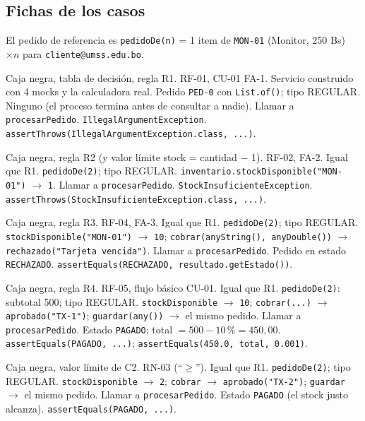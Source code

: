 \documentclass[11pt,a4paper,oneside]{report}
\newcommand{\code}[1]{\texttt{#1}}
\begin{document}
\subsection{Fichas de los casos}
El pedido de referencia es \code{pedidoDe(n)} = 1 item de \code{MON-01} (Monitor, 250 Bs) $\times n$ para \code{cliente@umss.edu.bo}.

{Caja negra, tabla de decisión, regla R1. RF-01, CU-01 FA-1.}
{Servicio construido con 4 mocks y la calculadora real.}
{Pedido \code{PED-0} con \code{List.of()}; tipo REGULAR.}
{Ninguno (el proceso termina antes de consultar a nadie).}
{Llamar a \code{procesarPedido}.}
{\code{IllegalArgumentException}.}
{\code{assertThrows(IllegalArgumentException.class, ...)}.}

{Caja negra, regla R2 (y valor límite stock = cantidad $-$ 1). RF-02, FA-2.}
{Igual que R1.}
{\code{pedidoDe(2)}; tipo REGULAR.}
{\code{inventario.stockDisponible("MON-01")} $\rightarrow$ \code{1}.}
{Llamar a \code{procesarPedido}.}
{\code{StockInsuficienteException}.}
{\code{assertThrows(StockInsuficienteException.class, ...)}.}

{Caja negra, regla R3. RF-04, FA-3.}
{Igual que R1.}
{\code{pedidoDe(2)}; tipo REGULAR.}
{\code{stockDisponible("MON-01")} $\rightarrow$ \code{10}; \code{cobrar(anyString(), anyDouble())} $\rightarrow$ \code{rechazado("Tarjeta vencida")}.}
{Llamar a \code{procesarPedido}.}
{Pedido en estado \code{RECHAZADO}.}
{\code{assertEquals(RECHAZADO, resultado.getEstado())}.}

{Caja negra, regla R4. RF-05, flujo básico CU-01.}
{Igual que R1.}
{\code{pedidoDe(2)}: subtotal 500; tipo REGULAR.}
{\code{stockDisponible} $\rightarrow$ \code{10}; \code{cobrar(...)} $\rightarrow$ \code{aprobado("TX-1")}; \code{guardar(any())} $\rightarrow$ el mismo pedido.}
{Llamar a \code{procesarPedido}.}
{Estado \code{PAGADO}; total $= 500 - 10$\,\%$ = 450{,}00$.}
{\code{assertEquals(PAGADO, ...)}; \code{assertEquals(450.0, total, 0.001)}.}

{Caja negra, valor límite de C2. RN-03 (``$\geq$'').}
{Igual que R1.}
{\code{pedidoDe(2)}; tipo REGULAR.}
{\code{stockDisponible} $\rightarrow$ \code{2}; \code{cobrar} $\rightarrow$ \code{aprobado("TX-2")}; \code{guardar} $\rightarrow$ el mismo pedido.}
{Llamar a \code{procesarPedido}.}
{Estado \code{PAGADO} (el stock justo alcanza).}
{\code{assertEquals(PAGADO, ...)}.}
\end{document}
